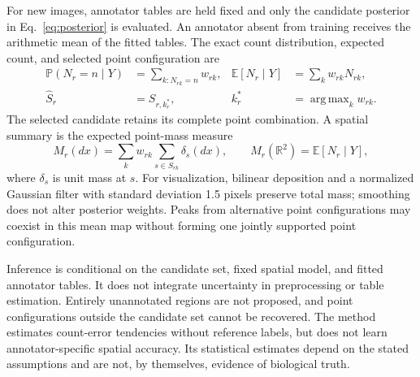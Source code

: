 \documentclass[a4paper,11pt]{article}
\newcommand{\Prob}{\mathbb{P}}
\newcommand{\E}{\mathbb{E}}
\newcommand{\R}{\mathbb{R}}
\DeclareMathOperator*{\argmax}{arg\,max}
\begin{document}
For new images, annotator tables are held fixed and only the candidate
posterior in Eq.~\eqref{eq:posterior} is evaluated. An annotator absent from
training receives the arithmetic mean of the fitted tables. The exact count
distribution, expected count, and selected point configuration are
\begin{align}
 \Prob(N_r=n\mid Y)&=\sum_{k:N_{rk}=n}w_{rk},
 &\E[N_r\mid Y]&=\sum_k w_{rk}N_{rk},
 \label{eq:count-output}\\
 \widehat S_r&=S_{r,k_r^*},
 &k_r^*&=\argmax_k w_{rk}.
 \label{eq:map-output}
\end{align}
The selected candidate retains its complete point combination. A spatial
summary is the expected point-mass measure
\begin{equation}
 M_r(dx)=\sum_k w_{rk}\sum_{s\in S_{rk}}\delta_s(dx),
 \qquad M_r(\R^2)=\E[N_r\mid Y],
 \label{eq:mass}
\end{equation}
where $\delta_s$ is unit mass at $s$. For visualization, bilinear deposition
and a normalized Gaussian filter with standard deviation 1.5 pixels preserve total mass;
smoothing does not alter posterior weights. Peaks from alternative point
configurations may coexist in this mean map without forming one jointly
supported point configuration.

Inference is conditional on the candidate set, fixed spatial model, and fitted
annotator tables. It does not integrate uncertainty in preprocessing or table
estimation. Entirely unannotated regions are not proposed, and point
configurations outside the candidate set cannot be recovered. The method
estimates count-error tendencies without reference labels, but does not learn
annotator-specific spatial accuracy. Its statistical estimates depend on the
stated assumptions and are not, by themselves, evidence of biological truth.
\end{document}
